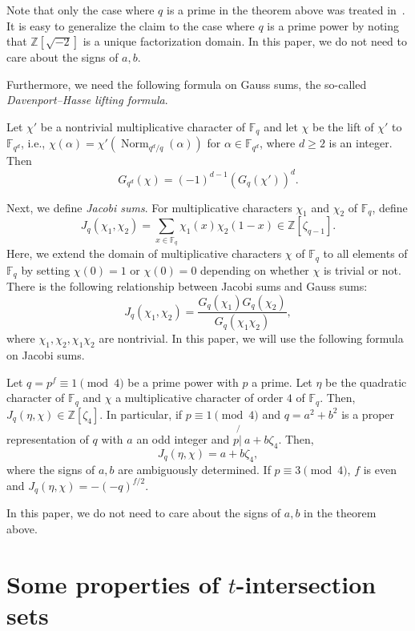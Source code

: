 \documentclass[ALCO,ThmDefs,Unicode]{cedram}
\DeclareMathOperator{\Norm}{Norm}
\newcommand*\Z{{\mathbb Z}}
\newcommand*\F{{\mathbb F}}
\newcommand*{\notmid}{\mathbin{\not{|}\:}}
\begin{document}
Note that only the case where $q$ is a prime in the theorem above was treated in~\cite{Mv}. It is easy to generalize the claim to the case where $q$ is a prime power by noting that $\Z[\sqrt{-2}]$ is a unique factorization domain. In this paper, we do not need to care about the signs of $a,b$.

Furthermore, we need the following formula on Gauss sums, the so-called \emph{Davenport--Hasse lifting formula}.

\begin{theo}\label{thm:lift}
Let $\chi'$ be a nontrivial multiplicative character of $\F_{q}$ and let $\chi$ be the lift of $\chi'$ to $\F_{q^{d}}$, i.e., $\chi(\alpha)=\chi'(\Norm_{q^{d}/q}(\alpha))$ for $\alpha\in \F_{q^{d}}$, where $d\geq 2$ is an integer. Then
\[
G_{q^d}(\chi)=(-1)^{d-1}(G_{q}(\chi'))^d.
\]
\end{theo}

Next, we define \emph{Jacobi sums}. For multiplicative characters $\chi_1$ and $\chi_2$ of $\F_q$, define
\[
J_q(\chi_1,\chi_2)=\sum_{x\in \F_q}\chi_1(x)\chi_2(1-x) \in \Z[\zeta_{q-1}].
\]
Here, we extend the domain of multiplicative characters $\chi$ of $\F_q$ to all elements of $\F_q$ by setting $\chi(0)=1$ or $\chi(0)=0$ depending on whether $\chi$ is trivial or not. There is the following relationship between Jacobi sums and Gauss sums:
\begin{equation}\label{eq:Gaussrelation}
J_q(\chi_1,\chi_2)=\frac{G_q(\chi_1)G_q(\chi_2)}{G_q(\chi_1\chi_2)},
\end{equation}
where $\chi_1,\chi_2,\chi_1\chi_2$ are nontrivial. In this paper, we will use the following formula on Jacobi sums.

\begin{theo}[\cite{St}]\label{lem:facto}
Let $q=p^f\equiv 1\pmod{4}$ be a prime power with $p$ a prime. Let $\eta$ be the quadratic character of $\F_q$ and $\chi$ a multiplicative character of order $4$ of $\F_q$. Then, $J_q(\eta,\chi)\in \Z[\zeta_4]$. In particular, if $p\equiv 1\pmod{4}$ and $q=a^2+b^2$ is a proper representation of $q$ with $a$ an odd integer and $p\notmid a+b\zeta_4$. Then,
\[
J_q(\eta,\chi)=a+b\zeta_4,
\]
where the signs of $a,b$ are ambiguously determined. If $p\equiv 3\pmod{4}$, $f$ is even and $J_q(\eta,\chi)=-(-q)^{f/2}$.
\end{theo}

In this paper, we do not need to care about the signs of $a,b$ in the theorem above.


\section{Some properties of \texorpdfstring{$t$}{t}-intersection sets}\label{sec:comp}
\end{document}
